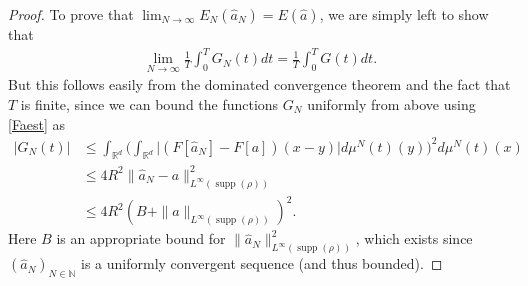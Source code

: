 \documentclass[A4paper,11pt]{article}
\theoremstyle{definition}
\newcommand{\N}{\mathbb{N}}
\newcommand{\R}{\mathbb{R}}
\DeclareMathOperator{\supp}{supp}
\begin{document}
\begin{proof}
	To prove that $\lim_{N \rightarrow \infty} E_N(\widehat a_N) = E(\widehat a)$, we are simply left to show that
	\begin{align*}
		\lim_{N\rightarrow\infty} \frac{1}{T} \int^T_0 G_N(t) dt = \frac{1}{T} \int^T_0 G(t) dt.
	\end{align*}
	But this follows easily from the dominated convergence theorem and the fact that $T$ is finite, since we can bound the functions $G_N$ uniformly from above using \eqref{Faest} as
	\begin{align*}
		|G_N(t)| & \leq \int_{\R^d}\Biggl(\int_{\R^d}\bigl|(F[\widehat a_{N}]-F[a])(x-y)\bigr|d\mu^{N}(t)(y)\Biggr)^2d\mu^N(t)(x) \\
		& \leq 4R^2 \|\widehat a_N - a \|^2_{L^{\infty}(\supp(\rho))} \\
		& \leq 4R^2(B + \|a \|_{L^{\infty}(\supp(\rho))})^2.
	\end{align*}
	Here $B$ is an appropriate bound for $\|\widehat a_N\|^2_{L^{\infty}(\supp(\rho))}$, which exists since $(\widehat a_N)_{N \in\N}$ is a uniformly convergent sequence (and thus bounded).
\end{proof}
\end{document}
